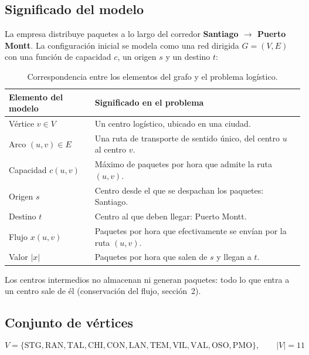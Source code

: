 \documentclass[12pt, a4paper]{article}
\begin{document}
\subsection{Significado del modelo}

La empresa distribuye paquetes a lo largo del corredor \textbf{Santiago $\to$ Puerto Montt}. La configuración inicial se modela como una red dirigida $G = (V, E)$ con una función de capacidad $c$, un origen $s$ y un destino $t$:

\begin{table}[H]
  \centering
  \begin{tabular}{lp{10.5cm}}
    \toprule
    \textbf{Elemento del modelo} & \textbf{Significado en el problema} \\
    \midrule
    Vértice $v \in V$ & Un centro logístico, ubicado en una ciudad. \\
    Arco $(u,v) \in E$ & Una ruta de transporte de sentido único, del centro $u$ al centro $v$. \\
    Capacidad $c(u,v)$ & Máximo de paquetes por hora que admite la ruta $(u,v)$. \\
    Origen $s$ & Centro desde el que se despachan los paquetes: Santiago. \\
    Destino $t$ & Centro al que deben llegar: Puerto Montt. \\
    Flujo $x(u,v)$ & Paquetes por hora que efectivamente se envían por la ruta $(u,v)$. \\
    Valor $\lvert x\rvert$ & Paquetes por hora que salen de $s$ y llegan a $t$. \\
    \bottomrule
  \end{tabular}
  \caption{Correspondencia entre los elementos del grafo y el problema logístico.}
  \label{tab:modelo}
\end{table}

Los centros intermedios no almacenan ni generan paquetes: todo lo que entra a un centro sale de él (conservación del flujo, sección~2).

\subsection{Conjunto de vértices}

\[
  V = \{\text{STG}, \text{RAN}, \text{TAL}, \text{CHI}, \text{CON}, \text{LAN}, \text{TEM}, \text{VIL}, \text{VAL}, \text{OSO}, \text{PMO}\}, \qquad \lvert V\rvert = 11
\]
\end{document}
